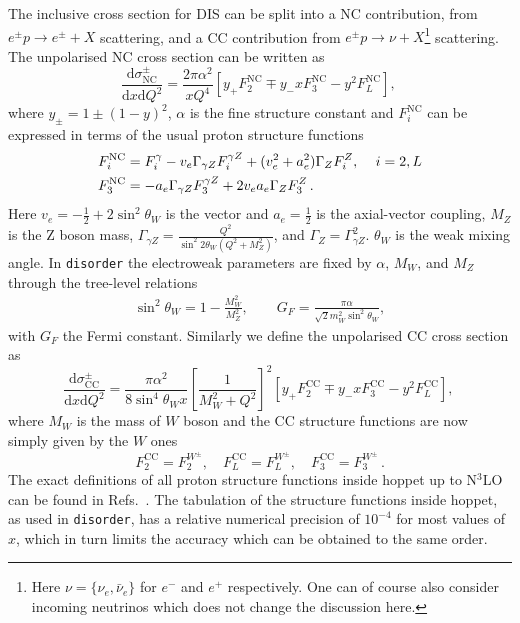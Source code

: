 \documentclass[submission, PhysCodeb]{SciPost}
\newcommand{\hoppet}{{\sc hoppet}}
\newcommand{\disorder}{{\tt disorder}}
\newcommand{\dd}{\mathrm{d}}
\newcommand{\NC}{\mathrm{NC}}
\newcommand{\CC}{\mathrm{CC}}
\newcommand{\NNNLO}{N$^3$LO}
\begin{document}
The inclusive cross section for DIS can be split into a NC
contribution, from $e^\pm p \to e^\pm + X$ scattering, and a CC
contribution from $e^\pm p \to \nu + X$\footnote{Here
$\nu=\{\nu_e,\bar{\nu}_e\}$ for $e^-$ and $e^+$ respectively. One can
of course also consider incoming neutrinos which does not change the
discussion here.} scattering. The unpolarised NC cross section can be
written as
\begin{equation}
\frac{\dd\sigma_{\NC}^\pm}{\dd x \dd Q^2} =   \frac{2\pi\alpha^2}{xQ^4} \left[y_+ F_2^{\NC} \mp y_- x F_3^\NC - y^2 F_L^\NC\right],\,
\label{eq:NCsigma}
\end{equation}
where $y_\pm=1\pm(1-y)^2$, $\alpha$ is the fine structure constant and
$F_i^\NC$ can be expressed in terms of the usual proton structure
functions
\begin{align}
  F_{i}^\NC &= F_{i}^\gamma  - v_e \Gamma_{\gamma Z} F_{i}^{\gamma Z} + (v_e^2 + a_e^2)\Gamma_{Z} F_{i}^{Z},\, \quad i =2,L \\ \notag
  F_{3}^\NC &= - a_e \Gamma_{\gamma Z} F_{3}^{\gamma Z} + 2v_e a_e\Gamma_{Z} F_{3}^{Z}\,.
\end{align}
Here $v_e = -\frac12 + 2 \sin^2\theta_W$ is the vector and
$a_e=\frac12$ is the axial-vector coupling, $M_Z$ is the Z boson mass,
$\Gamma_{\gamma Z} = \frac{Q^2}{\sin^2 2\theta_W(Q^2+M_Z^2)}$, and
$\Gamma_Z=\Gamma_{\gamma Z}^2$. $\theta_W$ is the weak mixing
angle. In \disorder{} the electroweak parameters are fixed by
$\alpha$, $M_W$, and $M_Z$ through the tree-level relations
\begin{align}
  \sin^2\theta_W = 1-\frac{M_W^2}{M_Z^2}, \qquad G_F = \frac{\pi\alpha}{\sqrt{2}m_W^2\sin^2\theta_W},
\end{align}
with $G_F$ the Fermi constant. Similarly we define the unpolarised CC
cross section as
\begin{equation}
\frac{\dd\sigma_{\CC}^\pm}{\dd x \dd Q^2} =   \frac{\pi\alpha^2}{8\sin^4\theta_W x}\left[\frac{1}{M_W^2 + Q^2}\right]^2 \left[y_+ F_2^{\CC} \mp y_- x F_3^\CC - y^2 F_L^\CC\right],\,
\label{eq:CCsigma}
\end{equation}
where $M_W$ is the mass of $W$ boson and the CC structure functions
are now simply given by the $W$ ones
\begin{equation}
  F_2^\CC = F_2^{W^\pm}, \quad   F_L^\CC = F_L^{W^\pm}, \quad   F_3^\CC = F_3^{W^\pm}\,.
\end{equation}
The exact definitions of all proton structure functions inside
\hoppet{} up to \NNNLO{} can be found in
Refs.~\cite{Salam:2008qg,BertoneKarlberg}. The tabulation of the
structure functions inside \hoppet{}, as used in \disorder{}, has a
relative numerical precision of $10^{-4}$ for most values of $x$,
which in turn limits the accuracy which can be obtained to the same
order.
\end{document}
